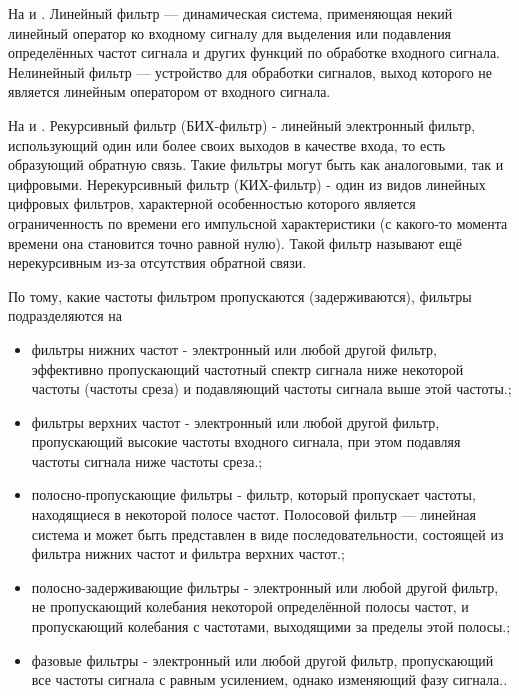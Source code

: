 \documentclass[a4paper,12pt]{article}
\begin{document}
На {} и {}. Линейный фильтр — динамическая система, применяющая некий линейный оператор ко входному сигналу для выделения или подавления определённых частот сигнала и других функций по обработке входного сигнала. Нелинейный фильтр — устройство для обработки сигналов, выход которого не является линейным оператором от входного сигнала.

На {} и {}. Рекурсивный фильтр (БИХ-фильтр) - линейный электронный фильтр, использующий один или более своих выходов в качестве входа, то есть образующий обратную связь. Такие фильтры могут быть как аналоговыми, так и цифровыми. Нерекурсивный фильтр (КИХ-фильтр) -  один из видов линейных цифровых фильтров, характерной особенностью которого является ограниченность по времени его импульсной характеристики (с какого-то момента времени она становится точно равной нулю). Такой фильтр называют ещё нерекурсивным из-за отсутствия обратной связи.

По тому, какие частоты фильтром пропускаются (задерживаются), фильтры подразделяются на
\begin{itemize}
	\item фильтры нижних частот -  электронный или любой другой фильтр, эффективно пропускающий частотный спектр сигнала ниже некоторой частоты (частоты среза) и подавляющий частоты сигнала выше этой частоты.;
	\item фильтры верхних частот -  электронный или любой другой фильтр, пропускающий высокие частоты входного сигнала, при этом подавляя частоты сигнала ниже частоты среза.;
	\item полосно-пропускающие фильтры -  фильтр, который пропускает частоты, находящиеся в некоторой полосе частот. Полосовой фильтр — линейная система и может быть представлен в виде последовательности, состоящей из фильтра нижних частот и фильтра верхних частот.;
	\item полосно-задерживающие фильтры -  электронный или любой другой фильтр, не пропускающий колебания некоторой определённой полосы частот, и пропускающий колебания с частотами, выходящими за пределы этой полосы.;
	\item фазовые фильтры - электронный или любой другой фильтр, пропускающий все частоты сигнала с равным усилением, однако изменяющий фазу сигнала..
\end{itemize}
\newpage
\end{document}
